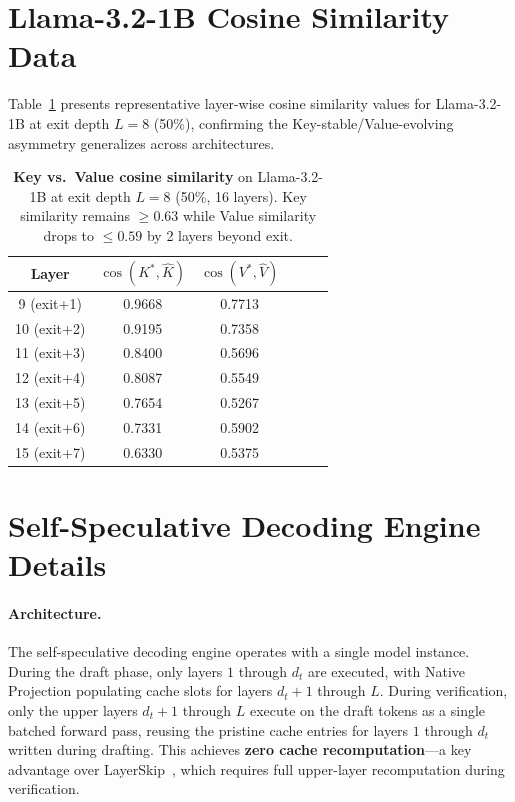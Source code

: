 \documentclass{article}
\newcommand{\dt}{d_t}
\newcommand{\Khat}{\hat{K}}
\newcommand{\Vhat}{\hat{V}}
\begin{document}
\section{Llama-3.2-1B Cosine Similarity Data}
\label{app:llama_cosine}

Table~\ref{tab:llama_cosine} presents representative layer-wise cosine similarity values for Llama-3.2-1B at exit depth $L{=}8$ (50\%), confirming the Key-stable/Value-evolving asymmetry generalizes across architectures.

\begin{table}[h]
\centering
\caption{\textbf{Key vs.\ Value cosine similarity} on Llama-3.2-1B at exit depth $L{=}8$ (50\%, 16 layers). Key similarity remains $\ge 0.63$ while Value similarity drops to $\le 0.59$ by 2 layers beyond exit.}
\label{tab:llama_cosine}
\small
\begin{tabular}{@{}cccccc@{}}
\toprule
\textbf{Layer} & $\cos(K^*, \Khat)$ & $\cos(V^*, \Vhat)$ \\
\midrule
9 (exit+1) & 0.9668 & 0.7713 \\
10 (exit+2) & 0.9195 & 0.7358 \\
11 (exit+3) & 0.8400 & 0.5696 \\
12 (exit+4) & 0.8087 & 0.5549 \\
13 (exit+5) & 0.7654 & 0.5267 \\
14 (exit+6) & 0.7331 & 0.5902 \\
15 (exit+7) & 0.6330 & 0.5375 \\
\bottomrule
\end{tabular}
\end{table}

\section{Self-Speculative Decoding Engine Details}
\label{app:engine}

\paragraph{Architecture.}
The self-speculative decoding engine operates with a single model instance. During the draft phase, only layers $1$ through $\dt$ are executed, with Native Projection populating cache slots for layers $\dt{+}1$ through $L$. During verification, only the upper layers $\dt{+}1$ through $L$ execute on the draft tokens as a single batched forward pass, reusing the pristine cache entries for layers $1$ through $\dt$ written during drafting. This achieves \textbf{zero cache recomputation}---a key advantage over LayerSkip~\cite{elhoushi2024layerskip}, which requires full upper-layer recomputation during verification.
\end{document}
